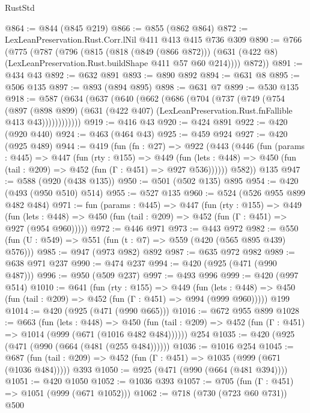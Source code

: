 \begin{lexlean}{RustStd}
\begin{coremodule}
@864 := @844 (@845 @219)
@866 := @855 (@862 @864)
@872 := LexLeanPreservation.Rust.Corr.lNil @411 @413 @415 @736 @309
@890 := @766
    (@775
      (@787
        (@796
          (@815
            (@818 (@849 (@866 @872)))
            (@631 (@422 @8) (LexLeanPreservation.Rust.buildShape @411 @57 @60 @214))))
        @872))
@891 := @434 @43
@892 := @632 @891
@893 := @890 @892
@894 := @631 @8
@895 := @506 @135
@897 := @893 (@894 @895)
@898 := @631 @7
@899 := @530 @135
@918 := @587
    (@634
      (@637
        (@640
          (@662
            (@686
              (@704
                (@737
                  (@749
                    (@754
                      (@897
                        (@898 @899)
                        (@631 (@422 @407) (LexLeanPreservation.Rust.fnFallible @413 @43))))))))))))
@919 := @416 @43
@920 := @424 @891
@922 := @420 (@920 @440)
@924 := @463 (@464 @43)
@925 := @459 @924
@927 := @420 (@925 @489)
@944 := @419
    (fun (fn : @27) =>
    @922
      (@443
        (@446
          (fun (params : @445) =>
          @447
            (fun (rty : @155) =>
            @449
              (fun (lets : @448) =>
              @450 (fun (tail : @209) => @452 (fun (Γ : @451) => @927 @536))))))
        @582))
    @135
@947 := @588 (@920 (@438 @135))
@950 := @501 (@502 @135) @895
@954 := @420 (@493 (@950 @510) @514)
@955 := @527 @135
@960 := @524 (@526 @955 @899 @482 @484)
@971 := fun (params : @445) =>
  @447
    (fun (rty : @155) =>
    @449
      (fun (lets : @448) => @450 (fun (tail : @209) => @452 (fun (Γ : @451) => @927 (@954 @960)))))
@972 := @446 @971
@973 := @443 @972
@982 := @550 (fun (U : @549) => @551 (fun (t : @7) => @559 (@420 (@565 @895 @439) @576)))
@985 := @947 (@973 @982) @892
@987 := @635 @972 @982
@989 := @638 @971 @237
@990 := @474 @237
@994 := @420 (@925 (@471 (@990 @487)))
@996 := @950 (@509 @237)
@997 := @493 @996
@999 := @420 (@997 @514)
@1010 := @641
    (fun (rty : @155) =>
    @449
      (fun (lets : @448) => @450 (fun (tail : @209) => @452 (fun (Γ : @451) => @994 (@999 @960)))))
    @199
@1014 := @420 (@925 (@471 (@990 @665)))
@1016 := @672 @955 @899
@1028 := @663
    (fun (lets : @448) =>
    @450 (fun (tail : @209) => @452 (fun (Γ : @451) => @1014 (@999 (@671 (@1016 @482 @484))))))
    @254
@1035 := @420 (@925 (@471 (@990 (@664 (@481 (@255 @484))))))
@1036 := @1016 @254
@1045 := @687 (fun (tail : @209) => @452 (fun (Γ : @451) => @1035 (@999 (@671 (@1036 @484))))) @393
@1050 := @925 (@471 (@990 (@664 (@481 @394))))
@1051 := @420 @1050
@1052 := @1036 @393
@1057 := @705 (fun (Γ : @451) => @1051 (@999 (@671 @1052)))
@1062 := @718 (@730 (@723 @60 @731)) @500

\end{coremodule}
\end{lexlean}

